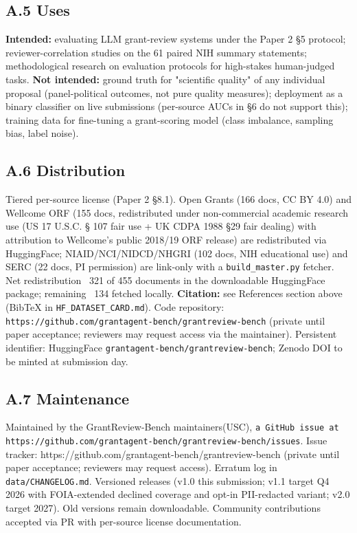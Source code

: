 \documentclass[11pt]{article}
\begin{document}
\subsection{A.5 Uses}
\textbf{Intended:} evaluating LLM grant-review systems under the Paper 2 §5 protocol; reviewer-correlation studies on the 61 paired NIH summary statements; methodological research on evaluation protocols for high-stakes human-judged tasks. \textbf{Not intended:} ground truth for "scientific quality" of any individual proposal (panel-political outcomes, not pure quality measures); deployment as a binary classifier on live submissions (per-source AUCs in §6 do not support this); training data for fine-tuning a grant-scoring model (class imbalance, sampling bias, label noise).

\subsection{A.6 Distribution}
Tiered per-source license (Paper 2 §8.1). Open Grants (166 docs, CC BY 4.0) and Wellcome ORF (155 docs, redistributed under non-commercial academic research use (US 17 U.S.C. § 107 fair use + UK CDPA 1988 §29 fair dealing) with attribution to Wellcome's public 2018/19 ORF release) are redistributed via HuggingFace; NIAID/NCI/NIDCD/NHGRI (102 docs, NIH educational use) and SERC (22 docs, PI permission) are link-only with a \texttt{build\_master.py} fetcher. Net redistribution ~321 of 455 documents in the downloadable HuggingFace package; remaining ~134 fetched locally. \textbf{Citation:} see References section above (BibTeX in \texttt{HF\_DATASET\_CARD.md}). Code repository: \texttt{https://github.com/grantagent-bench/grantreview-bench} (private until paper acceptance; reviewers may request access via the maintainer). Persistent identifier: HuggingFace \texttt{grantagent-bench/grantreview-bench}; Zenodo DOI to be minted at submission day.

\subsection{A.7 Maintenance}
Maintained by the GrantReview-Bench maintainers(USC), \texttt{a GitHub issue at https://github.com/grantagent-bench/grantreview-bench/issues}. Issue tracker: https://github.com/grantagent-bench/grantreview-bench (private until paper acceptance; reviewers may request access). Erratum log in \texttt{data/CHANGELOG.md}. Versioned releases (v1.0 this submission; v1.1 target Q4 2026 with FOIA-extended declined coverage and opt-in PII-redacted variant; v2.0 target 2027). Old versions remain downloadable. Community contributions accepted via PR with per-source license documentation.
\end{document}
